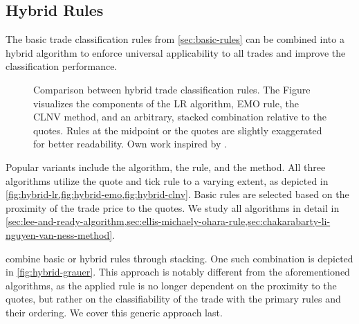 \subsection{Hybrid Rules}\label{sec:hybrid-rules}

The basic trade classification rules from \cref{sec:basic-rules} can be combined into a hybrid algorithm to enforce universal applicability to all trades and improve the classification performance.


\begin{figure}[ht!]
  \hfill%
  \hfill%
  \hfill%
  \caption[Comparison Between Hybrid Trade Classification Rules]{Comparison between hybrid trade classification rules. The Figure visualizes the components of the \acrshort{LR} algorithm, \acrshort{EMO} rule, the \acrshort{CLNV} method, and an arbitrary, stacked combination relative to the quotes. Rules at the midpoint or the quotes are slightly exaggerated for better readability. Own work inspired by \textcite[][167]{poppeSensitivityVPINChoice2016}.}
  \label{fig:hybrid-algorithms}
\end{figure}

Popular variants include the  algorithm, the  rule, and the  method. All three algorithms utilize the quote and tick rule to a varying extent, as depicted in \cref{fig:hybrid-lr,fig:hybrid-emo,fig:hybrid-clnv}. Basic rules are selected based on the proximity of the trade price to the quotes. We study all algorithms in detail in \cref{sec:lee-and-ready-algorithm,sec:ellis-michaely-ohara-rule,sec:chakarabarty-li-nguyen-van-ness-method}.

\textcite[][18]{grauerOptionTradeClassification2022} combine basic or hybrid rules through stacking. One such combination is depicted in \cref{fig:hybrid-grauer}. This approach is notably different from the aforementioned algorithms, as the applied rule is no longer dependent on the proximity to the quotes, but rather on the classifiability of the trade with the primary rules and their ordering. We cover this generic approach last.
